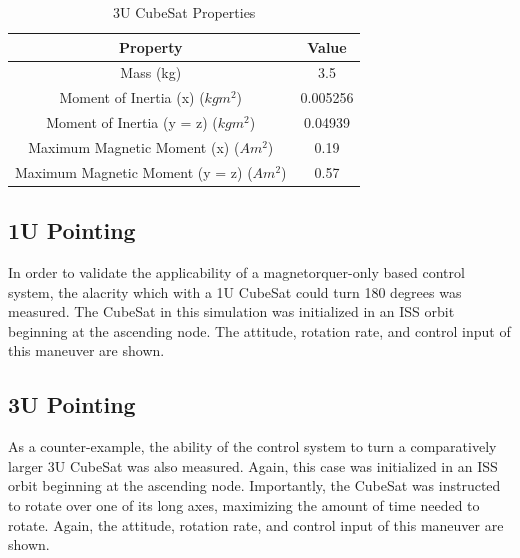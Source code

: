 \documentclass[letterpaper, preprint, paper,11pt]{IAA-AAS}	%
\begin{document}
\begin{table}[htbp]
	\fontsize{10}{10}\selectfont
    \caption{3U CubeSat Properties}
   \label{tab:label}
        \centering 
   \begin{tabular}{c | c } %
      \hline 
      Property & Value\\
      \hline
      Mass (kg) & 3.5\\
      \hline
      Moment of Inertia (x) ($kgm^2$) & 0.005256\\
      \hline
      Moment of Inertia (y = z) ($kgm^2$) & 0.04939\\
	\hline
      Maximum Magnetic Moment (x) ($Am^2$) & 0.19\\
      \hline
      Maximum Magnetic Moment (y = z) ($Am^2$) & 0.57\\
      \hline
   \end{tabular}
\end{table}

\subsection{1U Pointing}
In order to validate the applicability of a magnetorquer-only based control system, the alacrity which with a 1U CubeSat could turn 180 degrees was measured. The CubeSat in this simulation was initialized in an ISS orbit beginning at the ascending node. The attitude, rotation rate, and control input of this maneuver are shown. 

\subsection{3U Pointing}
As a counter-example, the ability of the control system to turn a comparatively larger 3U CubeSat was also measured. Again, this case was initialized in an ISS orbit beginning at the ascending node. Importantly, the CubeSat was instructed to rotate over one of its long axes, maximizing the amount of time needed to rotate. Again, the attitude, rotation rate, and control input of this maneuver are shown. 
\end{document}
